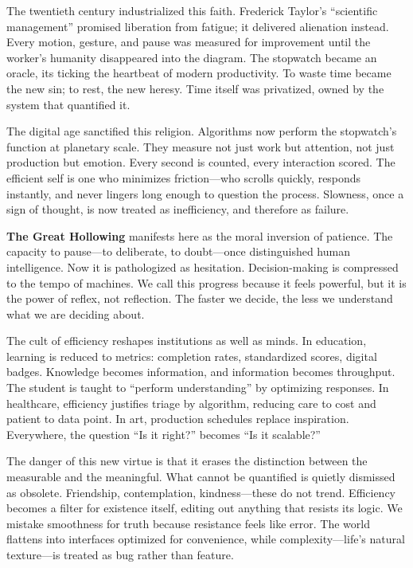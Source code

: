 \documentclass[11pt,twoside]{book}
\begin{document}
The twentieth century industrialized this faith.  Frederick Taylor’s “scientific management” promised liberation from fatigue; it delivered alienation instead.  Every motion, gesture, and pause was measured for improvement until the worker’s humanity disappeared into the diagram.  The stopwatch became an oracle, its ticking the heartbeat of modern productivity.  To waste time became the new sin; to rest, the new heresy.  Time itself was privatized, owned by the system that quantified it.

The digital age sanctified this religion.  Algorithms now perform the stopwatch’s function at planetary scale.  They measure not just work but attention, not just production but emotion.  Every second is counted, every interaction scored.  The efficient self is one who minimizes friction—who scrolls quickly, responds instantly, and never lingers long enough to question the process.  Slowness, once a sign of thought, is now treated as inefficiency, and therefore as failure.

\textbf{The Great Hollowing} manifests here as the moral inversion of patience.  The capacity to pause—to deliberate, to doubt—once distinguished human intelligence.  Now it is pathologized as hesitation.  Decision-making is compressed to the tempo of machines.  We call this progress because it feels powerful, but it is the power of reflex, not reflection.  The faster we decide, the less we understand what we are deciding about.

The cult of efficiency reshapes institutions as well as minds.  In education, learning is reduced to metrics: completion rates, standardized scores, digital badges.  Knowledge becomes information, and information becomes throughput.  The student is taught to “perform understanding” by optimizing responses.  In healthcare, efficiency justifies triage by algorithm, reducing care to cost and patient to data point.  In art, production schedules replace inspiration.  Everywhere, the question “Is it right?” becomes “Is it scalable?”

The danger of this new virtue is that it erases the distinction between the measurable and the meaningful.  What cannot be quantified is quietly dismissed as obsolete.  Friendship, contemplation, kindness—these do not trend.  Efficiency becomes a filter for existence itself, editing out anything that resists its logic.  We mistake smoothness for truth because resistance feels like error.  The world flattens into interfaces optimized for convenience, while complexity—life’s natural texture—is treated as bug rather than feature.
\end{document}
